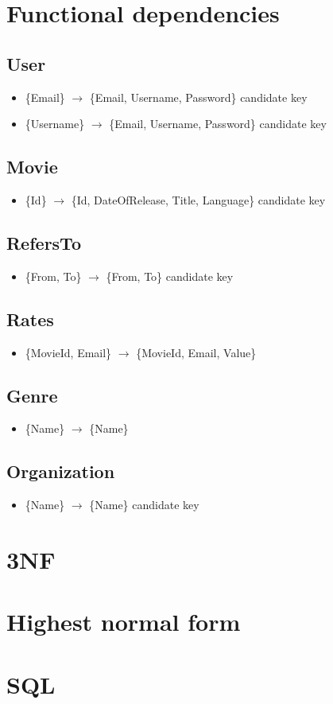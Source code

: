 \section{Functional dependencies}
{
\newcommand{\derives}[3]{\item{\{#1\} $\rightarrow$ \{#2\}} 
\ifthenelse{\equal{#3}{true}}
   	{candidate key}
   	{}
}
\subsection*{User}
\begin{itemize}
\item{\{Email\} $\rightarrow$ \{Email, Username, Password\}} candidate key
\item{\{Username\} $\rightarrow$ \{Email, Username, Password\} candidate key}
\end{itemize}

\subsection*{Movie}
\begin{itemize}
\item{\{Id\} $\rightarrow$ \{Id, DateOfRelease, Title, Language\} candidate key}
\end{itemize}

\subsection*{RefersTo}
\begin{itemize}
\item{\{From, To\} $\rightarrow$ \{From, To\} candidate key}
\end{itemize}

\subsection*{Rates}
\begin{itemize}
\item \{MovieId, Email\} $\rightarrow$ \{MovieId, Email, Value\}
\end{itemize}

\subsection*{Genre}
\begin{itemize}
\item \{Name\} $\rightarrow$ \{Name\}
\end{itemize}

\subsection*{Organization}
\begin{itemize}
\item{\{Name\} $\rightarrow$ \{Name\} candidate key}
\end{itemize}
}
\section{3NF}

\section{Highest normal form}

\section{SQL}